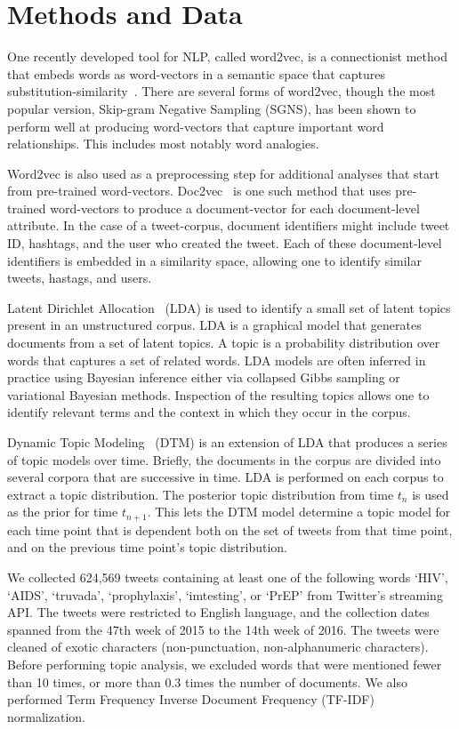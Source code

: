 \documentclass[conference]{IEEEtran}
\begin{document}
\section{Methods and Data}

One recently developed tool for NLP, called word2vec, is a connectionist method that embeds words as word-vectors in a semantic space that captures substitution-similarity~\cite{mikolov2013efficient}. There are several forms of word2vec, though the most popular version, Skip-gram Negative Sampling (SGNS), has been shown to perform well at producing word-vectors that capture important word relationships. This includes most notably word analogies. 

Word2vec is also used as a preprocessing step for additional analyses that start from pre-trained word-vectors. Doc2vec~\cite{le2014distributed} is one such method that uses pre-trained word-vectors to produce a document-vector for each document-level attribute. In the case of a tweet-corpus, document identifiers might include tweet ID, hashtags, and the user who created the tweet. Each of these document-level identifiers is embedded in a similarity space, allowing one to identify similar tweets, hastags, and users.

Latent Dirichlet Allocation~\cite{blei2003latent} (LDA) is used to identify a small set of latent topics present in an unstructured corpus. LDA is a graphical model that generates documents from a set of latent topics. A topic is a probability distribution over words that captures a set of related words. LDA models are often inferred in practice using Bayesian inference either via collapsed Gibbs sampling or variational Bayesian methods. Inspection of the resulting topics allows one to identify relevant terms and the context in which they occur in the corpus. 

Dynamic Topic Modeling~\cite{blei2006dynamic} (DTM) is an extension of LDA that produces a series of topic models over time. Briefly, the documents in the corpus are divided into several corpora that are successive in time. LDA is performed on each corpus to extract a topic distribution. The posterior topic distribution from time $t_n$ is used as the prior for time $t_{n+1}$. This lets the DTM model determine a topic model for each time point that is dependent both on the set of tweets from that time point, and on the previous time point's topic distribution.

We collected 624,569 tweets containing at least one of the following words `HIV', `AIDS', `truvada', `prophylaxis', `imtesting', or `PrEP' from Twitter's streaming API. The tweets were restricted to English language, and the collection dates spanned from the 47th week of 2015 to the 14th week of 2016. The tweets were cleaned of exotic characters (non-punctuation, non-alphanumeric characters). Before performing topic analysis, we excluded words that were mentioned fewer than 10 times, or more than 0.3 times the number of documents. We also performed Term Frequency Inverse Document Frequency (TF-IDF) normalization.
\end{document}
